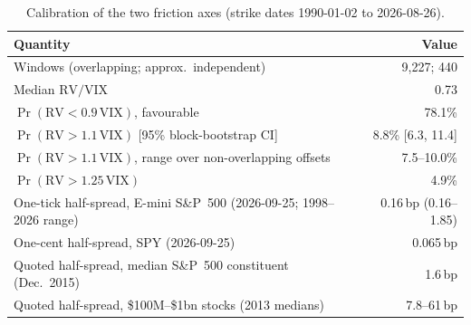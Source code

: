 \documentclass{article}
\newcommand{\bps}{\,bp}
\begin{document}
\begin{table}[h]
  \caption{Calibration of the two friction axes (strike dates 1990-01-02 to 2026-08-26).}
  \label{tab:calibration}
  \centering
  \small
  \begin{tabular}{lr}
    \toprule
    Quantity & Value \\
    \midrule
    Windows (overlapping; approx.\ independent) & 9{,}227; 440 \\
    Median $\mathrm{RV}/\mathrm{VIX}$ & 0.73 \\
    $\Pr(\mathrm{RV} < 0.9\,\mathrm{VIX})$, favourable & 78.1\% \\
    $\Pr(\mathrm{RV} > 1.1\,\mathrm{VIX})$ [95\% block-bootstrap CI] & 8.8\% [6.3, 11.4] \\
    $\Pr(\mathrm{RV} > 1.1\,\mathrm{VIX})$, range over non-overlapping offsets & 7.5--10.0\% \\
    $\Pr(\mathrm{RV} > 1.25\,\mathrm{VIX})$ & 4.9\% \\
    One-tick half-spread, E-mini S\&P~500 (2026-09-25; 1998--2026 range) & 0.16\bps{} (0.16--1.85) \\
    One-cent half-spread, SPY (2026-09-25) & 0.065\bps{} \\
    Quoted half-spread, median S\&P~500 constituent (Dec.\ 2015) & 1.6\bps{} \\
    Quoted half-spread, \$100M--\$1bn stocks (2013 medians) & 7.8--61\bps{} \\
    \bottomrule
  \end{tabular}
\end{table}
\end{document}
